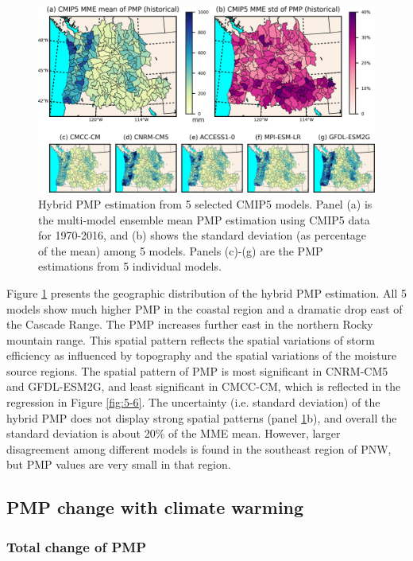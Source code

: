 \begin{figure}[htbp]
	\includegraphics[width=\linewidth]{pics/ch5/fig7.jpg}
	\caption{Hybrid PMP estimation from 5 selected CMIP5 models. Panel (a) is the multi-model ensemble mean PMP estimation using CMIP5 data for 1970-2016, and (b) shows the standard deviation (as percentage of the mean) among 5 models. Panels (c)-(g) are the PMP estimations from 5 individual models.}
	\label{fig:5-7}
\end{figure}

Figure \ref{fig:5-7} presents the geographic distribution of the hybrid PMP estimation. All 5 models show much higher PMP in the coastal region and a dramatic drop east of the Cascade Range. The PMP increases further east in the northern Rocky mountain range. This spatial pattern reflects the spatial variations of storm efficiency as influenced by topography and the spatial variations of the moisture source regions. The spatial pattern of PMP is most significant in CNRM-CM5 and GFDL-ESM2G, and least significant in CMCC-CM, which is reflected in the regression in Figure \ref{fig:5-6}.  The uncertainty (i.e. standard deviation) of the hybrid PMP does not display strong spatial patterns (panel \ref{fig:5-7}b), and overall the standard deviation is about 20\% of the MME mean. However, larger disagreement among different models is found in the southeast region of PNW, but PMP values are very small in that region.

\subsection{PMP change with climate warming}

\subsubsection{Total change of PMP}

